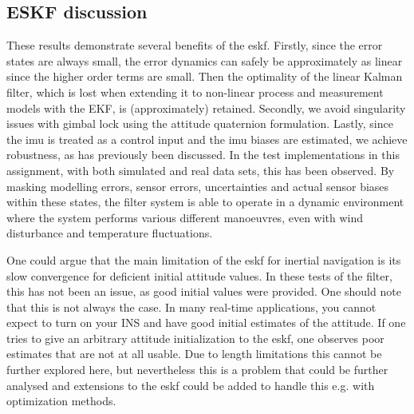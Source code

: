 
\subsection{ESKF discussion}

These results demonstrate several benefits of the \acrshort{eskf}. Firstly, since the error states are always small, the error dynamics can safely be approximately as linear since the higher order terms are small. Then the optimality of the linear Kalman filter, which is lost when extending it to non-linear process and measurement models with the EKF, is (approximately) retained. Secondly, we avoid singularity issues with gimbal lock using the attitude quaternion formulation. Lastly, since the \acrshort{imu} is treated as a control input and the \acrshort{imu} biases are estimated, we achieve robustness, as has previously been discussed. In the test implementations in this assignment, with both simulated and real data sets, this has been observed. By masking modelling errors, sensor errors, uncertainties and actual sensor biases within these states, the filter system is able to operate in a dynamic environment where the system performs various different manoeuvres, even with wind disturbance and temperature fluctuations.

One could argue that the main limitation of the \acrshort{eskf} for inertial navigation is its slow convergence for deficient initial attitude values. In these tests of the filter, this has not been an issue, as good initial values were provided. One should note that this is not always the case. In many real-time applications, you cannot expect to turn on your INS and have good initial estimates of the attitude. If one tries to give an arbitrary attitude initialization to the \acrshort{eskf}, one observes poor estimates that are not at all usable. Due to length limitations this cannot be further explored here, but nevertheless this is a problem that could be further analysed and extensions to the \acrshort{eskf} could be added to handle this e.g. with optimization methods.